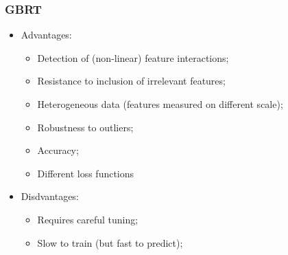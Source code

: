\documentclass{beamer}
\begin{document}
\begin{frame}
\frametitle{GBRT} %
    \begin{itemize}
    \item <+-| alert@+> Advantages:
    \begin{itemize}
        \item Detection of (non-linear) feature interactions; 
        \item Resistance to inclusion of irrelevant features; %
        \item Heterogeneous data (features measured on different scale);
        \item Robustness to outliers;
        \item Accuracy; %
        \item Different loss functions %
    \end{itemize}
    \item <+-| alert@+> Disdvantages:
    \begin{itemize}
        \item Requires careful tuning;
        \item Slow to train (but fast to predict);
    \end{itemize}
    \end{itemize}
\end{frame}

\end{document}
